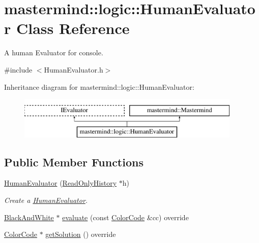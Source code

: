 \hypertarget{classmastermind_1_1logic_1_1_human_evaluator}{}\section{mastermind\+:\+:logic\+:\+:Human\+Evaluator Class Reference}
\label{classmastermind_1_1logic_1_1_human_evaluator}


A human Evaluator for console.  




{\ttfamily \#include $<$Human\+Evaluator.\+h$>$}

Inheritance diagram for mastermind\+:\+:logic\+:\+:Human\+Evaluator\+:\begin{figure}[H]
\begin{center}
\leavevmode
\includegraphics[height=2.000000cm]{classmastermind_1_1logic_1_1_human_evaluator}
\end{center}
\end{figure}
\subsection*{Public Member Functions}
\begin{DoxyCompactItemize}
\item 
\hyperlink{classmastermind_1_1logic_1_1_human_evaluator_ab1e96e3389a2932631a302e3cbaef8ff}{Human\+Evaluator} (\hyperlink{classmastermind_1_1logic_1_1_read_only_history}{Read\+Only\+History} $\ast$h)
\begin{DoxyCompactList}\small\item\em Create a \hyperlink{classmastermind_1_1logic_1_1_human_evaluator}{Human\+Evaluator}. \end{DoxyCompactList}\item 
\hyperlink{classmastermind_1_1logic_1_1_black_and_white}{Black\+And\+White} $\ast$ \hyperlink{classmastermind_1_1logic_1_1_human_evaluator_ac427121219b8e69ed30b0e123ce622a4}{evaluate} (const \hyperlink{classmastermind_1_1logic_1_1_color_code}{Color\+Code} \&cc) override
\item 
\hyperlink{classmastermind_1_1logic_1_1_color_code}{Color\+Code} $\ast$ \hyperlink{classmastermind_1_1logic_1_1_human_evaluator_ab369895151e4702e8b57d74c8f6869db}{get\+Solution} () override
\end{DoxyCompactItemize}
